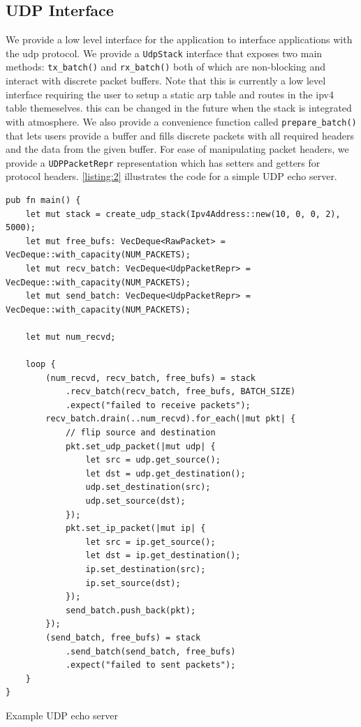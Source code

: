 \subsection{UDP Interface}
We provide a low level interface for the application to interface applications with the udp protocol. We provide a \lstinline{UdpStack} interface that exposes two main methods: \lstinline{tx_batch()} and \lstinline{rx_batch()} both of which are non-blocking and interact with discrete packet buffers. Note that this is currently a low level interface requiring the user to setup a static arp table and routes in the ipv4 table themeselves. this can be changed in the future when the stack is integrated with atmosphere. We also provide a convenience function called \lstinline{prepare_batch()} that lets users provide a buffer and fills discrete packets with all required headers and the data from the given buffer. For ease of manipulating packet headers, we provide a \lstinline{UDPPacketRepr} representation which has setters and getters for protocol headers. \ref{listing:2} illustrates the code for a simple UDP echo server.

\begin{listing}[!htb]
\begin{verbatim}
pub fn main() {
    let mut stack = create_udp_stack(Ipv4Address::new(10, 0, 0, 2), 5000);
    let mut free_bufs: VecDeque<RawPacket> = VecDeque::with_capacity(NUM_PACKETS);
    let mut recv_batch: VecDeque<UdpPacketRepr> = VecDeque::with_capacity(NUM_PACKETS);
    let mut send_batch: VecDeque<UdpPacketRepr> = VecDeque::with_capacity(NUM_PACKETS);

    let mut num_recvd;

    loop {
        (num_recvd, recv_batch, free_bufs) = stack
            .recv_batch(recv_batch, free_bufs, BATCH_SIZE)
            .expect("failed to receive packets");
        recv_batch.drain(..num_recvd).for_each(|mut pkt| {
            // flip source and destination
            pkt.set_udp_packet(|mut udp| {
                let src = udp.get_source();
                let dst = udp.get_destination();
                udp.set_destination(src);
                udp.set_source(dst);
            });
            pkt.set_ip_packet(|mut ip| {
                let src = ip.get_source();
                let dst = ip.get_destination();
                ip.set_destination(src);
                ip.set_source(dst);
            });
            send_batch.push_back(pkt);
        });
        (send_batch, free_bufs) = stack
            .send_batch(send_batch, free_bufs)
            .expect("failed to sent packets");
    }
}
\end{verbatim}
\caption{Example UDP echo server}
\label{listing:2}
\end{listing}
